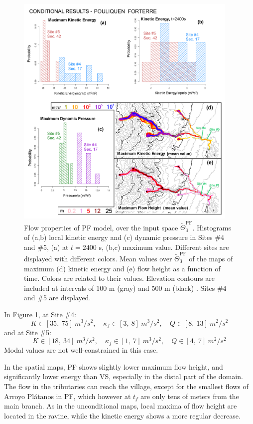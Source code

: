 \documentclass[nhess, manuscript]{copernicus}
\begin{document}
\begin{figure}[H]
\centering
\includegraphics[width=0.95\textwidth]{Fig12_PF.png}
\caption{Flow properties of PF model, over the input space $\tilde\Theta_3^{\textrm{PF}}$. Histograms of (a,b) local kinetic energy and (c) dynamic pressure in Sites \#4 and \#5, (a) at $t=2400$ s, (b,c) maximum value. Different sites are displayed with different colors. Mean values over $\tilde\Theta_3^{\textrm{PF}}$ of the maps of maximum (d) kinetic energy and (e) flow height as a function of time. Colors are related to their values. Elevation contours are included at intervals of 100 m (gray) and 500 m (black) \citep{NASA2014}. Sites \#4 and \#5 are displayed.}
\label{Fig12a}
\end{figure}

In Figure \ref{Fig12a}, at Site \#4:
$$K\in[35,\ 75]\ m^3/s^2,\quad \kappa_f\in[3,\ 8]\ m^3/s^2,\quad Q\in[8,\ 13]\ m^2/s^2$$
and at Site \#5:
$$K\in[18,\ 34]\ m^3/s^2,\quad \kappa_f\in[1,\ 7]\ m^3/s^2,\quad Q\in[4,\ 7]\ m^2/s^2$$
Modal values are not well-constrained in this case.

In the spatial maps, PF shows slightly lower maximum flow height, and significantly lower energy than VS, especially in the distal part of the domain. The flow in the tributaries can reach the village, except for the smallest flows of Arroyo Pl\'atanos in PF, which however at $t_f$ are only tens of meters from the main branch. As in the unconditional maps, local maxima of flow height are located in the ravine, while the kinetic energy shows a more regular decrease.
\end{document}

